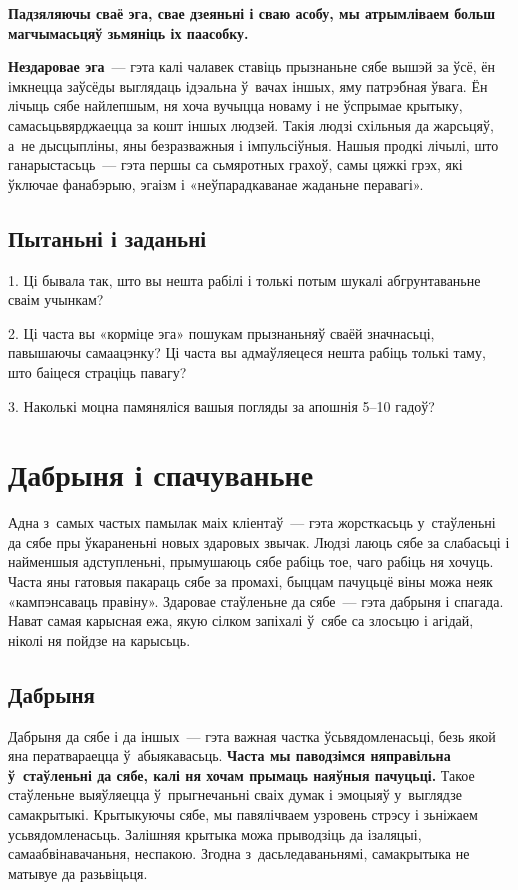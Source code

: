 \textbf{Падзяляючы сваё эга, свае дзеяньні і сваю асобу, мы атрымліваем больш магчымасьцяў зьмяніць іх паасобку.}

\textbf{Нездаровае эга}~--- гэта калі чалавек ставіць прызнаньне сябе вышэй за ўсё, ён імкнецца заўсёды выглядаць ідэальна ў~вачах іншых, яму патрэбная ўвага. Ён лічыць сябе найлепшым, ня хоча вучыцца новаму і не ўспрымае крытыку, самасьцьвярджаецца за кошт іншых людзей. Такія людзі схільныя да жарсьцяў, а~не дысцыпліны, яны безразважныя і імпульсіўныя. Нашыя продкі лічылі, што ганарыстасьць~--- гэта першы са сьмяротных грахоў, самы цяжкі грэх, які ўключае фанабэрыю, эгаізм і «неўпарадкаванае жаданьне перавагі».

\subsection*{Пытаньні і заданьні}

1. Ці бывала так, што вы нешта рабілі і толькі потым шукалі абгрунтаваньне сваім учынкам?

2. Ці часта вы «корміце эга» пошукам прызнаньняў сваёй значнасьці, павышаючы самаацэнку? Ці часта вы адмаўляецеся нешта рабіць толькі таму, што баіцеся страціць павагу?

3. Наколькі моцна памяняліся вашыя погляды за апошнія 5--10 гадоў?


\section{Дабрыня і спачуваньне}

Адна з~самых частых памылак маіх кліентаў~--- гэта жорсткасьць у~стаўленьні да сябе пры ўкараненьні новых здаровых звычак. Людзі лаюць сябе за слабасьці і найменшыя адступленьні, прымушаюць сябе рабіць тое, чаго рабіць ня хочуць. Часта яны гатовыя пакараць сябе за промахі, быццам пачуцьцё віны можа неяк «кампэнсаваць правіну». Здаровае стаўленьне да сябе~--- гэта дабрыня і спагада. Нават самая карысная ежа, якую сілком запіхалі ў~сябе са злосьцю і агідай, ніколі ня пойдзе на карысьць. 

\subsection*{Дабрыня}

Дабрыня да сябе і да іншых~--- гэта важная частка ўсьвядомленасьці, безь якой яна ператвараецца ў~абыякавасьць. \textbf{Часта мы паводзімся няправільна ў~стаўленьні да сябе, калі ня хочам прымаць наяўныя пачуцьці.} Такое стаўленьне выяўляецца ў~прыгнечаньні сваіх думак і эмоцыяў у~выглядзе самакрытыкі. Крытыкуючы сябе, мы павялічваем узровень стрэсу і зьніжаем усьвядомленасьць. Залішняя крытыка можа прыводзіць да ізаляцыі, самаабвінавачаньня, неспакою. Згодна з~дасьледаваньнямі, самакрытыка не матывуе да разьвіцьця.

